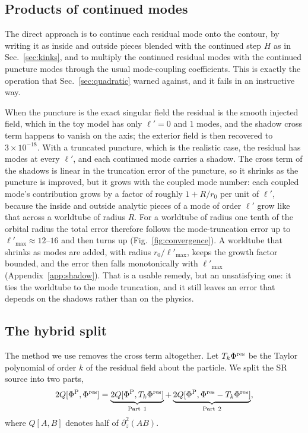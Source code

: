 \documentclass[aps,prd,twocolumn,superscriptaddress,nofootinbib,floatfix]{revtex4-2}
\newcommand{\PhiP}{\Phi^{\rm P}}
\newcommand{\Pres}{\Phi^{\rm res}}
\begin{document}
\subsection{Products of continued modes}\label{sec:product}

The direct approach is to continue each residual mode onto the contour, by writing it as inside and outside pieces blended with the continued step $H$ as in Sec.~\ref{sec:kinks}, and to multiply the continued residual modes with the continued puncture modes through the usual mode-coupling coefficients.
This is exactly the operation that Sec.~\ref{sec:quadratic} warned against, and it fails in an instructive way.

When the puncture is the exact singular field the residual is the smooth injected field, which in the toy model has only $\ell'=0$ and $1$ modes, and the shadow cross term happens to vanish on the axis; the exterior field is then recovered to $3\times10^{-18}$.
With a truncated puncture, which is the realistic case, the residual has modes at every $\ell'$, and each continued mode carries a shadow.
The cross term of the shadows is linear in the truncation error of the puncture, so it shrinks as the puncture is improved, but it grows with the coupled mode number: each coupled mode's contribution grows by a factor of roughly $1+R/r_0$ per unit of $\ell'$, because the inside and outside analytic pieces of a mode of order $\ell'$ grow like that across a worldtube of radius $R$.
For a worldtube of radius one tenth of the orbital radius the total error therefore follows the mode-truncation error up to $\ell'_{\max}\approx12$--$16$ and then turns up (Fig.~\ref{fig:convergence}).
A worldtube that shrinks as modes are added, with radius $r_0/\ell'_{\max}$, keeps the growth factor bounded, and the error then falls monotonically with $\ell'_{\max}$ (Appendix~\ref{app:shadow}).
That is a usable remedy, but an unsatisfying one: it ties the worldtube to the mode truncation, and it still leaves an error that depends on the shadows rather than on the physics.

\subsection{The hybrid split}\label{sec:hybrid}

The method we use removes the cross term altogether.
Let $T_k\Pres$ be the Taylor polynomial of order $k$ of the residual field about the particle.
We split the SR source into two parts,
\begin{equation}
2Q[\PhiP,\Pres]=\underbrace{2Q[\PhiP,T_k\Pres]}_{\rm Part\ 1}+\underbrace{2Q[\PhiP,\Pres-T_k\Pres]}_{\rm Part\ 2},
\label{eq:hybrid}
\end{equation}
where $Q[A,B]$ denotes half of $\partial_z^2(AB)$.
\end{document}
